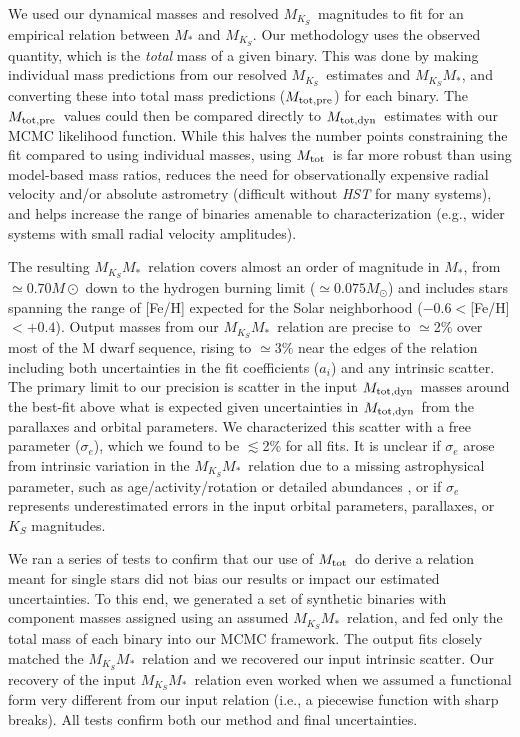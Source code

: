 \documentclass[twocolumn]{aastex62}
\newcommand{\mks}{$M_{K_S}$}
\newcommand{\mmk}{$M_{K_S}$\textendash$M_*$}
\newcommand{\mtot}{$M_{\rm{tot}}$}
\newcommand{\mpred}{$M_{\rm{tot,pre}}$}
\newcommand{\mdyn}{$M_{\rm{tot,dyn}}$}
\begin{document}
We used our dynamical masses and resolved \mks\ magnitudes to fit for an empirical relation between $M_*$ and \mks. Our methodology uses the observed quantity, which is the {\it total} mass of a given binary. This was done by making individual mass predictions from our resolved \mks\ estimates and \mmk, and converting these into total mass predictions (\mpred) for each binary. The \mpred\ values could then be compared directly to \mdyn\ estimates with our MCMC likelihood function. While this halves the number points constraining the fit compared to using individual masses, using \mtot\ is far more robust than using model-based mass ratios, reduces the need for observationally expensive radial velocity and/or absolute astrometry (difficult without {\it HST} for many systems), and helps increase the range of binaries amenable to characterization (e.g., wider systems with small radial velocity amplitudes). 

The resulting \mmk\ relation covers almost an order of magnitude in $M_*$, from $\simeq0.70M\odot$ down to the hydrogen burning limit ($\simeq0.075M_\odot$) and includes stars spanning the range of [Fe/H] expected for the Solar neighborhood ($-0.6<$[Fe/H]$<+0.4$). Output masses from our \mmk\ relation are precise to $\simeq$2\% over most of the M dwarf sequence, rising to $\simeq3\%$ near the edges of the relation including both uncertainties in the fit coefficients ($a_i$) and any intrinsic scatter. The primary limit to our precision is scatter in the input \mdyn\ masses around the best-fit above what is expected given uncertainties in \mdyn\ from the parallaxes and orbital parameters. We characterized this scatter with a free parameter ($\sigma_e$), which we found to be $\lesssim$2\% for all fits. It is unclear if $\sigma_e$ arose from intrinsic variation in the \mmk\ relation due to a missing astrophysical parameter, such as age/activity/rotation \citep[e.g.,][]{Kraus2011,Feiden:2016aa,Somers2017} or detailed abundances \citep[e.g.,][]{2017A&A...604A..97L,Veyette2017}, or if $\sigma_e$ represents underestimated errors in the input orbital parameters, parallaxes, or $K_S$ magnitudes. 

We ran a series of tests to confirm that our use of \mtot\ do derive a relation meant for single stars did not bias our results or impact our estimated uncertainties. To this end, we generated a set of synthetic binaries with component masses assigned using an assumed \mmk\ relation, and fed only the total mass of each binary into our MCMC framework. The output fits closely matched the \mmk\ relation and we recovered our input intrinsic scatter. Our recovery of the input \mmk\ relation even worked when we assumed a functional form very different from our input relation (i.e., a piecewise function with sharp breaks). All tests confirm both our method and final uncertainties.
\end{document}
